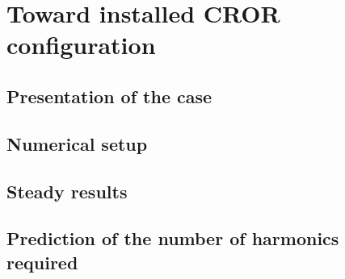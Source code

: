 \chapter{Toward installed CROR configuration}
\label{cha:hera3_installed}

\chabstract{}


\newpage

\section{Presentation of the case}
\label{sec:hera3_presentation}


\section{Numerical setup}
\label{sec:hera3_numerical}


\section{Steady results}
\label{sec:hera3_steady_results}


\section{Prediction of the number of harmonics required}
\label{sec:hera3_prediction_harm}


\chconclu{}
